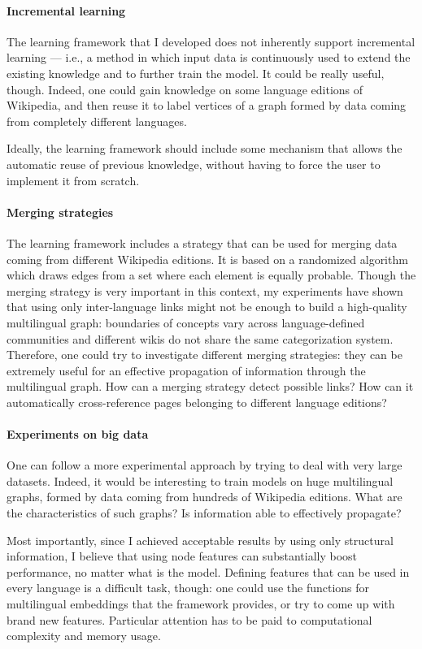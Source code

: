        \paragraph{Incremental learning}
            The learning framework that I developed does not inherently support incremental learning --- i.e., a method in which input data is continuously used to extend the existing knowledge and to further train the model. It could be really useful, though. Indeed, one could gain knowledge on some language editions of Wikipedia, and then reuse it to label vertices of a graph formed by data coming from completely different languages.
            
            Ideally, the learning framework should include some mechanism that allows the automatic reuse of previous knowledge, without having to force the user to implement it from scratch.
        \paragraph{Merging strategies}
            The learning framework includes a strategy that can be used for merging data coming from different Wikipedia editions. It is based on a randomized algorithm which draws edges from a set where each element is equally probable. Though the merging strategy is very important in this context, my experiments have shown that using only inter-language links might not be enough to build a high-quality multilingual graph: boundaries of concepts vary across language-defined communities and different wikis do not share the same categorization system. Therefore, one could try to investigate different merging strategies: they can be extremely useful for an effective propagation of information through the multilingual graph. How can a merging strategy detect possible links? How can it automatically cross-reference pages belonging to different language editions?

        \paragraph{Experiments on big data}
            One can follow a more experimental approach by trying to deal with very large datasets. Indeed, it would be interesting to train models on huge multilingual graphs, formed by data coming from hundreds of Wikipedia editions. What are the characteristics of such graphs? Is information able to effectively propagate?
            
            Most importantly, since I achieved acceptable results by using only structural information, I believe that using node features can substantially boost performance, no matter what is the model. Defining features that can be used in every language is a difficult task, though: one could use the functions for multilingual embeddings that the framework provides, or try to come up with brand new features. Particular attention has to be paid to computational complexity and memory usage.